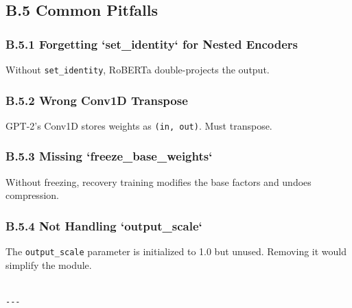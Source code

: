 \subsection{B.5 Common Pitfalls}

\subsubsection{B.5.1 Forgetting `set\_identity` for Nested Encoders}

Without \texttt{set\_identity}, RoBERTa double-projects the output.

\subsubsection{B.5.2 Wrong Conv1D Transpose}

GPT-2's Conv1D stores weights as \texttt{(in, out)}. Must transpose.

\subsubsection{B.5.3 Missing `freeze\_base\_weights`}

Without freezing, recovery training modifies the base factors and undoes 
compression.

\subsubsection{B.5.4 Not Handling `output\_scale`}

The \texttt{output\_scale} parameter is initialized to 1.0 but unused. Removing 
it would simplify the module.
\begin{lstlisting}

---
\end{lstlisting}